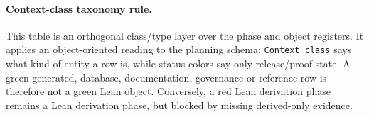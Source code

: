 \paragraph{Context-class taxonomy rule.} This table is an orthogonal class/type layer over the phase and object registers. It applies an object-oriented reading to the planning schema: \texttt{Context class} says what kind of entity a row is, while status colors say only release/proof state. A green generated, database, documentation, governance or reference row is therefore not a green Lean object. Conversely, a red Lean derivation phase remains a Lean derivation phase, but blocked by missing derived-only evidence.


